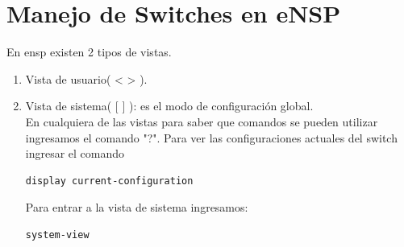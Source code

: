 \documentclass[journal]{IEEEtran}
\begin{document}
\section{\textbf{Manejo de Switches en eNSP}}
En ensp existen 2 tipos de vistas.
\begin{enumerate}
	\item Vista de usuario( <  > ).
	\item Vista de sistema( [ ] ): es el modo de configuración global.\\
	En cualquiera de las vistas para saber que comandos se pueden utilizar ingresamos el comando "?".
	Para ver las configuraciones actuales del switch ingresar el comando 
	\begin{lstlisting}[frame=single]
display current-configuration
	\end{lstlisting}
	
	Para entrar a la vista de sistema ingresamos:
	\begin{lstlisting}[frame=single]
system-view
	\end{lstlisting}
\end{enumerate}
\end{document}
